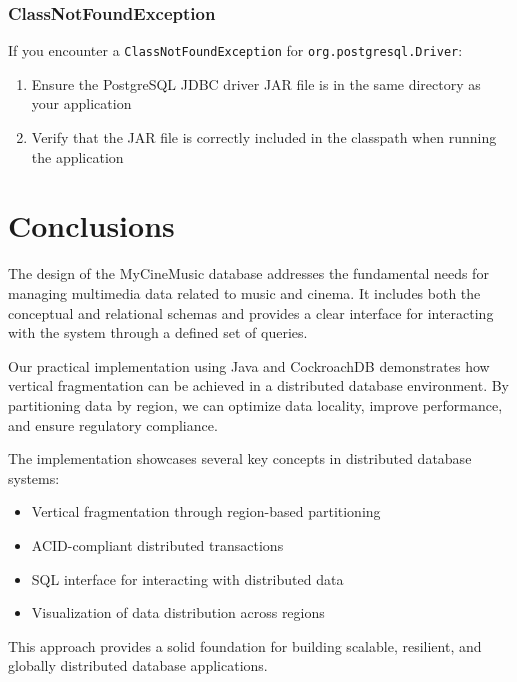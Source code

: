 \documentclass[twoside]{article}
\begin{document}
\subsubsection{ClassNotFoundException}

If you encounter a \texttt{ClassNotFoundException} for \texttt{org.postgresql.Driver}:
\begin{enumerate}
  \item Ensure the PostgreSQL JDBC driver JAR file is in the same directory as your application
  \item Verify that the JAR file is correctly included in the classpath when running the application
\end{enumerate}

\section{Conclusions}
The design of the MyCineMusic database addresses the fundamental needs for managing multimedia data related to music and cinema. It includes both the conceptual and relational schemas and provides a clear interface for interacting with the system through a defined set of queries.

Our practical implementation using Java and CockroachDB demonstrates how vertical fragmentation can be achieved in a distributed database environment. By partitioning data by region, we can optimize data locality, improve performance, and ensure regulatory compliance.

The implementation showcases several key concepts in distributed database systems:
\begin{itemize}
  \item Vertical fragmentation through region-based partitioning
  \item ACID-compliant distributed transactions
  \item SQL interface for interacting with distributed data
  \item Visualization of data distribution across regions
\end{itemize}

This approach provides a solid foundation for building scalable, resilient, and globally distributed database applications.
\end{document}
